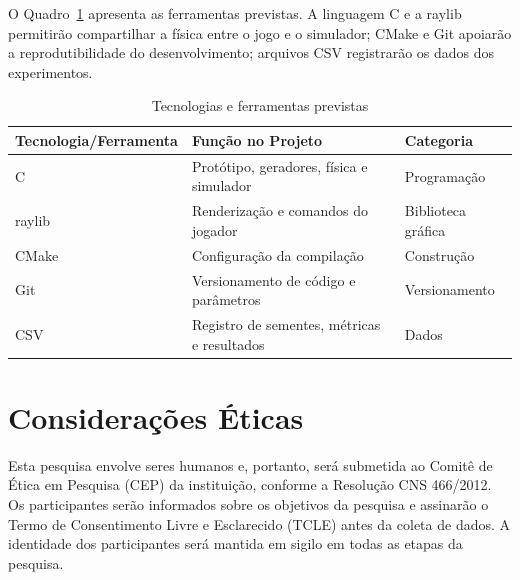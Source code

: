 O Quadro~\ref{qua:tecnologias} apresenta as ferramentas previstas. 
A linguagem C e a raylib permitirão compartilhar a física entre o jogo e o simulador; 
CMake e Git apoiarão a reprodutibilidade do desenvolvimento; 
arquivos CSV registrarão os dados dos experimentos.

\begin{table}[htb]
\caption{Tecnologias e ferramentas previstas}
\label{qua:tecnologias}
\begin{tabularx}{\textwidth}{lXl}
  \toprule
  \textbf{Tecnologia/Ferramenta} & \textbf{Função no Projeto} & \textbf{Categoria} \\
  \midrule
  C & Protótipo, geradores, física e simulador & Programação \\
  raylib & Renderização e comandos do jogador & Biblioteca gráfica \\
  CMake & Configuração da compilação & Construção \\
  Git & Versionamento de código e parâmetros & Versionamento \\
  CSV & Registro de sementes, métricas e resultados & Dados \\
  \bottomrule
\end{tabularx}
\end{table}

\section{Considerações Éticas}
\label{sec:consideracoes-eticas}

Esta pesquisa envolve seres humanos e, portanto, será submetida
ao Comitê de Ética em Pesquisa (CEP) da instituição, conforme
a Resolução CNS 466/2012. Os participantes serão informados
sobre os objetivos da pesquisa e assinarão o Termo de
Consentimento Livre e Esclarecido (TCLE) antes da coleta
de dados. A identidade dos participantes será mantida em
sigilo em todas as etapas da pesquisa.
